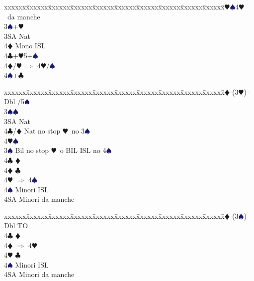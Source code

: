\documentclass[a4paper,italian]{article}
\newcommand{\BC}{\textcolor{OliveGreen}{$\clubsuit$}}
\newcommand{\BD}{\textcolor{RedOrange}{$\vardiamondsuit$}}
\newcommand{\BH}{\textcolor{Red2}{$\varheartsuit${}}}
\newcommand{\BS}{\textcolor{MidnightBlue}{$\spadesuit${}}}
\newenvironment{bidtable}
{\begin{tabbing}

    xxxxxx\=xxxxxx\=xxxxxx\=xxxxxx\=xxxxxx\=xxxxxx\=xxxxxx\=xxxxxx\=xxxxxx\=xxxxxx\=\kill}
{\end{tabbing} }%
\begin{document}
\begin{multicols}{2}
\begin{bidtable}
                                            4\BH {}\BS 4\BH\ da manche\-\-\\
                                            3\BS {}+\BH \+\\
                                            3SA \> Nat\+\\
                                            4\BD \> Mono ISL\-\-\\
                                            4\BC {}+\BH5+\BS\\
                                            4\BD/\BH \> $\Rightarrow$ 4\BH /\BS \\
                                            4\BS {}+\BC \-
                                        \end{bidtable}
                                        \begin{bidtable}
                                            2\BD-(3\BH)--\+\\
                                            Dbl /5\BS\ \+\\
                                            3\BS{}\BS\ \\
                                            3SA\> Nat\\
                                            4\BC/\BD\> Nat no stop \BH\ no 3\BS\ \\
                                            4\BH{}\BS \-\\
                                            3\BS \> Bil no stop \BH\ o BIL ISL no 4\BS \\
                                            4\BC \> \BD \\
                                            4\BD \> \BC \\
                                            4\BH \> $\Rightarrow$ 4\BS \\
                                            4\BS \> Minori ISL\\
                                            4SA \> Minori da manche\-
                                        \end{bidtable}
                                        \begin{bidtable}
                                            2\BD-(3\BS)--\+\\
                                            Dbl \> TO\\
                                            4\BC \> \BD \\
                                            4\BD \> $\Rightarrow$ 4\BH \\
                                            4\BH \> \BC \\
                                            4\BS \> Minori ISL\\
                                            4SA \> Minori da manche\-
                                        \end{bidtable}
                                    \end{multicols}
                                    \newpage
\end{document}
